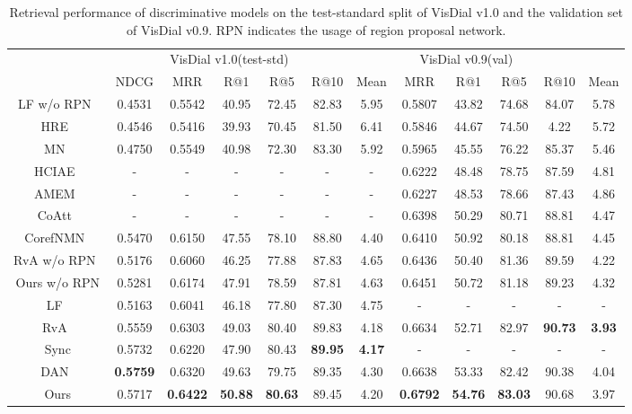 \documentclass[10pt,twocolumn,letterpaper]{article}
\begin{document}
\linespread{0.65}
\begin{table*}
\begin{center}
\small
\begin{tabular}{
cccccccccccc}
\toprule
\multirow{2}{*}{} & \multicolumn{5}{c}{VisDial v1.0(test-std)} & \multicolumn{5}{c}{VisDial v0.9(val)}  \\
\cmidrule(r){2-7} \cmidrule(r){8-12} 
&  NDCG      &  MRR   &   R@1   &   R@5   &R@10    &  Mean   
&  MRR   &   R@1   &   R@5   &R@10    &  Mean  \\
\midrule
LF w/o RPN~\cite{das2017visual}    &0.4531 &0.5542 &40.95 &72.45 &82.83 &5.95 &0.5807 &43.82 &74.68 &84.07 &5.78         \\
HRE~\cite{das2017visual}   &0.4546 &0.5416 &39.93 &70.45 &81.50 &6.41 &0.5846 &44.67 &74.50 &4.22  &5.72         \\
MN~\cite{das2017visual}    &0.4750 &0.5549 &40.98 &72.30 &83.30 &5.92 &0.5965 &45.55 &76.22 &85.37 &5.46         \\
HCIAE~\cite{lu2017best}   &- &- &- &- &- &-                        &0.6222 &48.48 &78.75 &87.59 &4.81         \\
AMEM~\cite{seo2017visual}  &- &- &- &- &- &-                          &0.6227 &48.53 &78.66 &87.43 &4.86         \\
CoAtt~\cite{lu2016hierarchical} &- &- &- &- &- &-                          &0.6398 &50.29 &80.71 &88.81 &4.47         \\
CorefNMN~\cite{kottur2018visual}  &0.5470 &0.6150 &47.55 &78.10 &88.80 &4.40 &0.6410 &50.92 &80.18 &88.81 &4.45     \\
RvA w/o RPN~\cite{niu2018recursive} &0.5176 &0.6060 &46.25 &77.88 &87.83 &4.65 &0.6436 &50.40 &81.36 &89.59 &4.22   \\
Ours w/o RPN   &0.5281 &0.6174 &47.91 &78.59 &87.81 &4.63 &0.6451 &50.72 &81.18 &89.23 &4.32\\
\midrule
LF~\cite{das2017visual}    &0.5163	&0.6041	&46.18	&77.80	&87.30	&4.75 &- &- &- &- &-                        \\
RvA~\cite{niu2018recursive}   &0.5559 &0.6303 &49.03 &80.40 &89.83 &4.18 &0.6634 &52.71 &82.97 &\textbf{90.73} &\textbf{3.93}         \\
Sync\cite{guo2019image} &0.5732  &0.6220  &47.90 &80.43 &\textbf{89.95} &\textbf{4.17}    &- &- &- &- &-  \\
DAN~\cite{kang2019dual}   &\textbf{0.5759} &0.6320 &49.63 &79.75 &89.35 &4.30 &0.6638 &53.33 &82.42 &90.38 &4.04         \\
\midrule  
Ours &0.5717  &\textbf{0.6422}  &\textbf{50.88} &\textbf{80.63} &89.45 &4.20   &\textbf{0.6792} &\textbf{54.76} &\textbf{83.03} &90.68 &3.97                            \\
\bottomrule
\end{tabular}
\end{center}
\caption{Retrieval performance of discriminative models on the test-standard split of VisDial v1.0 and the validation set of VisDial v0.9. RPN indicates the usage of region proposal network.}
\label{table:v1.0test}
\end{table*}
\end{document}
